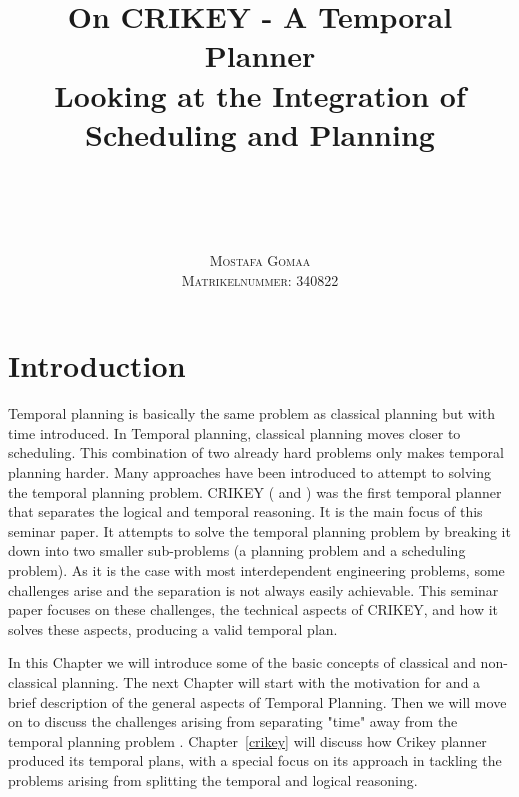 \documentclass
[a4paper
,english
,parskip=half
,bibliography=totoc
]{scrreprt}
\title{
    On CRIKEY - A Temporal Planner\\ 
    Looking at the Integration of\\
    Scheduling and Planning
}
\author{
    \\
    \\
    \\
    \\
    \scshape Mostafa Gomaa\\
    \scshape \small Matrikelnummer: 340822
}
\date{}
\begin{document}
\pagestyle{useheadings}
\maketitle
\tableofcontents
\cleardoublepage
\pagestyle{scrheadings}




\chapter{Introduction}

Temporal planning is basically the same problem as classical planning but with time introduced. In Temporal planning, classical planning moves closer to scheduling. This combination of two already hard problems only makes temporal planning harder. Many approaches have been introduced to attempt to solving the temporal planning problem.
CRIKEY (\citet{crikey_1} and \citet{crikey_2}) was the first temporal planner that separates the logical and temporal reasoning. It is the main focus of this seminar paper. It attempts to solve the temporal planning problem by breaking it down into two smaller sub-problems (a planning problem and a scheduling problem). As it is the case with most interdependent engineering problems, some challenges arise and the separation is not always easily achievable. This seminar paper focuses on these challenges, the technical aspects of CRIKEY, and how it solves these aspects, producing a valid temporal plan.

In this Chapter we will introduce some of the basic concepts of classical and non-classical planning. The next Chapter will start with the motivation for and a brief description of the general aspects of Temporal Planning. Then we will move on to discuss the challenges arising from separating "time" away from the temporal planning problem . Chapter~\ref{crikey} will discuss how Crikey planner produced its temporal plans, with a special focus on its approach in tackling the problems arising from splitting the temporal and logical reasoning.
\end{document}
